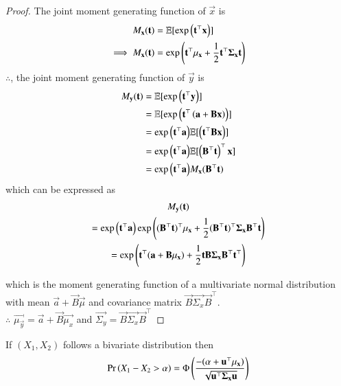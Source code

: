 \begin{proof}
   The joint moment generating function of $\vec{x}$ is
   \begin{align}
       M_{\mathbf{x}}(\mathbf{t})&=\mathbb{E}[\exp{\ensuremath{\left(\mathbf{t}^{\top}\mathbf{x}\right)}}]\\
       \implies M_{\mathbf{x}}(\mathbf{t})&=\exp{\ensuremath{\left(\mathbf{t}^{\top}\mathbf{\mu_x}+\frac{1}{2}\mathbf{t}^{\top}\mathbf{\Sigma_x}\mathbf{t}\right)}}
   \end{align}
   $\therefore$, the joint moment generating function of $\vec{y}$ is
   \begin{align}
       M_{\mathbf{y}}(\mathbf{t})&=\mathbb{E}[\exp{\ensuremath{\left(\mathbf{t}^{\top}\mathbf{y}\right)}}]\\
                           &=\mathbb{E}[\exp{\ensuremath{\left(\mathbf{t}^{\top}\left(\mathbf{a}+\mathbf{B}\mathbf{x}\right)\right)}}]\\ &=\exp{\ensuremath{\left(\mathbf{t}^{\top}\mathbf{a}\right)}}\mathbb{E}[\left(\mathbf{t}^{\top}{\mathbf{B}\mathbf{x}}\right)]\\ &=\exp{\ensuremath{\left(\mathbf{t}^{\top}\mathbf{a}\right)}}\mathbb{E}[\left(\mathbf{B}^{\top}\mathbf{t}\right)^{\top}\mathbf{x}]\\
                           &=\exp{\ensuremath{\left(\mathbf{t}^{\top}\mathbf{a}\right)}}M_{\mathbf{x}}(\mathbf{B}^{\top}\mathbf{t})
        \end{align}
        which can be expressed as
        \begin{multline}
            M_{\mathbf{y}}(\mathbf{t})     \\                      =\exp{\ensuremath{\left(\mathbf{t}^{\top}\mathbf{a}\right)}}\exp{\ensuremath{\left((\mathbf{B}^{\top}\mathbf{t})^{\top}\mathbf{\mu_x}+\frac{1}{2}(\mathbf{B}^{\top}\mathbf{t})^{\top}\mathbf{\Sigma_x}\mathbf{B}^{\top}\mathbf{t}\right)}}\\
                           =\exp\left(\mathbf{t}^{\top}(\mathbf{a}+\mathbf{B}\mathbf{\mu_x})+\frac{1}{2}\mathbf{t}\mathbf{B}\mathbf{\Sigma_x}\mathbf{B}^{\top}\mathbf{t}^{\top}\right)
        \end{multline}
   
   which is the moment generating function of a multivariate normal distribution with mean $\vec{a}+\vec{B}\vec{\mu}$ and covariance matrix $\vec{B}\vec{\Sigma_x}\vec{B}^{\top}$.\\
   
   $\therefore$ $\vec{\mu_\vec{y}}=\vec{a}+\vec{B}\vec{\mu_x}$ and $\vec{\Sigma_y}=\vec{B}\vec{\Sigma_x}\vec{B}^{\top}$
\end{proof}
\begin{theorem}\label{1.1}
   If $(X_1,X_2)$ follows a bivariate distribution then 
   \begin{align}
    \Pr\left(X_1-X_2>\alpha\right)=\Phi\left(\frac{-(\alpha+\mathbf{u}^{\top}\mathbf{\mu_{\mathbf{x}})}}{\sqrt{\mathbf{u}^{\top}\mathbf{\Sigma_{\mathbf{x}}}\mathbf{u}}}\right)
   \end{align}
\end{theorem}
